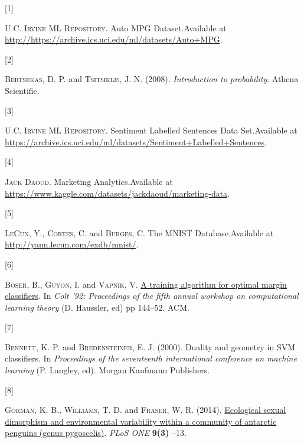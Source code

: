 \documentclass[
  11pt,
  letterpaper,
]{scrbook}
\newlength{\cslhangindent}
\newlength{\csllabelwidth}
\newlength{\cslentryspacingunit} %
\newenvironment{CSLReferences}[2] %
 {%
  \setlength{\parindent}{0pt}
  \ifodd #1
  \let\oldpar\par
  \def\par{\hangindent=\cslhangindent\oldpar}
  \fi
  \setlength{\parskip}{#2\cslentryspacingunit}
 }%
 {}
\newcommand{\CSLLeftMargin}[1]{\parbox[t]{\csllabelwidth}{#1}}
\newcommand{\CSLRightInline}[1]{\parbox[t]{\linewidth - \csllabelwidth}{#1}\break}
\theoremstyle{plain}
\theoremstyle{plain}
\theoremstyle{remark}
\begin{document}

\hypertarget{refs}{}
\begin{CSLReferences}{0}{0}
\leavevmode{}%
\CSLLeftMargin{{[}1{]} }%
\CSLRightInline{\textsc{U.C. Irvine ML Repository}. {Auto MPG
Dataset}.Available at
\url{http://https://archive.ics.uci.edu/ml/datasets/Auto+MPG}.}

\leavevmode{}%
\CSLLeftMargin{{[}2{]} }%
\CSLRightInline{\textsc{Bertsekas}, D. P. and \textsc{Tsitsiklis}, J. N.
(2008). \emph{Introduction to probability}. Athena Scientific.}

\leavevmode{}%
\CSLLeftMargin{{[}3{]} }%
\CSLRightInline{\textsc{U.C. Irvine ML Repository}. {Sentiment Labelled
Sentences Data Set}.Available at
\url{https://archive.ics.uci.edu/ml/datasets/Sentiment+Labelled+Sentences}.}

\leavevmode{}%
\CSLLeftMargin{{[}4{]} }%
\CSLRightInline{\textsc{Jack Daoud}. {Marketing Analytics}.Available at
\url{https://www.kaggle.com/datasets/jackdaoud/marketing-data}.}

\leavevmode{}%
\CSLLeftMargin{{[}5{]} }%
\CSLRightInline{\textsc{LeCun}, Y., \textsc{Cortes}, C. and
\textsc{Burges}, C. {The MNIST Database}.Available at
\url{http://yann.lecun.com/exdb/mnist/}.}

\leavevmode{}%
\CSLLeftMargin{{[}6{]} }%
\CSLRightInline{\textsc{Boser}, B., \textsc{Guyon}, I. and
\textsc{Vapnik}, V.
\href{https://dl.acm.org/doi/pdf/10.1145/130385.130401}{{A training
algorithm for optimal margin classifiers}}. In \emph{Colt '92:
Proceedings of the fifth annual workshop on computational learning
theory} (D. Haussler, ed) pp 144--52. ACM.}

\leavevmode{}%
\CSLLeftMargin{{[}7{]} }%
\CSLRightInline{\textsc{Bennett}, K. P. and \textsc{Bredensteiner}, E.
J. (2000). Duality and geometry in SVM classifiers. In \emph{Proceedings
of the seventeenth international conference on machine learning} (P.
Langley, ed). Morgan Kaufmann Publishers.}

\leavevmode{}%
\CSLLeftMargin{{[}8{]} }%
\CSLRightInline{\textsc{Gorman}, K. B., \textsc{Williams}, T. D. and
\textsc{Fraser}, W. R. (2014).
\href{https://doi.org/10.1371/journal.pone.0090081}{Ecological sexual
dimorphism and environmental variability within a community of antarctic
penguins (genus pygoscelis)}. \emph{PLoS ONE} \textbf{9(3)} --13.}


\end{CSLReferences}
\end{document}
